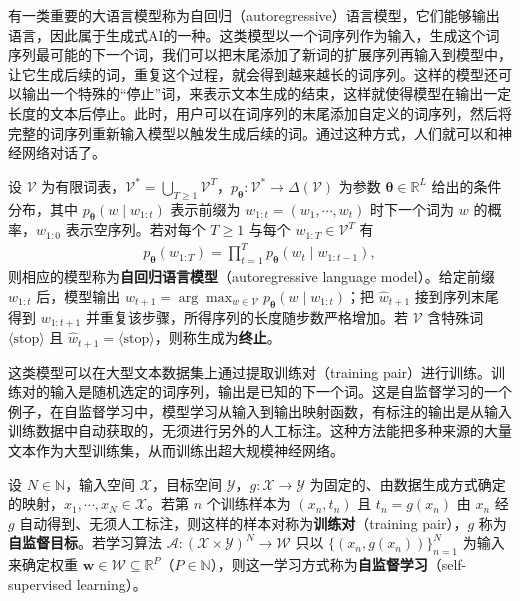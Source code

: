 \documentclass[../../main.tex]{subfiles}
\begin{document}
有一类重要的大语言模型称为自回归（autoregressive）语言模型，它们能够输出语言，因此属于生成式AI的一种。这类模型以一个词序列作为输入，生成这个词序列最可能的下一个词，我们可以把末尾添加了新词的扩展序列再输入到模型中，让它生成后续的词，重复这个过程，就会得到越来越长的词序列。这样的模型还可以输出一个特殊的“停止”词，来表示文本生成的结束，这样就使得模型在输出一定长度的文本后停止。此时，用户可以在词序列的末尾添加自定义的词序列，然后将完整的词序列重新输入模型以触发生成后续的词。通过这种方式，人们就可以和神经网络对话了。

\begin{definition}[自回归语言模型]\label{definition:ch01-自回归语言模型}
设 $\mathcal{V}$ 为有限词表，$\mathcal{V}^{*}=\bigcup_{T\geqslant1}\mathcal{V}^{T}$，$p_{\boldsymbol{\theta}}:\mathcal{V}^{*}\to\Delta(\mathcal{V})$ 为参数 $\boldsymbol{\theta}\in\mathbb{R}^{L}$ 给出的条件分布，其中 $p_{\boldsymbol{\theta}}(w\mid w_{1:t})$ 表示前缀为 $w_{1:t}=(w_{1},\cdots,w_{t})$ 时下一个词为 $w$ 的概率，$w_{1:0}$ 表示空序列。若对每个 $T\geqslant1$ 与每个 $w_{1:T}\in\mathcal{V}^{T}$ 有
\begin{align*}
  p_{\boldsymbol{\theta}}(w_{1:T})=\prod_{t=1}^{T}p_{\boldsymbol{\theta}}(w_{t}\mid w_{1:t-1}),
\end{align*}
则相应的模型称为\textbf{自回归语言模型}（autoregressive language model）。给定前缀 $w_{1:t}$ 后，模型输出 $\hat{w}_{t+1}=\arg\max_{w\in\mathcal{V}}p_{\boldsymbol{\theta}}(w\mid w_{1:t})$；把 $\hat{w}_{t+1}$ 接到序列末尾得到 $w_{1:t+1}$ 并重复该步骤，所得序列的长度随步数严格增加。若 $\mathcal{V}$ 含特殊词 $\langle\mathrm{stop}\rangle$ 且 $\hat{w}_{t+1}=\langle\mathrm{stop}\rangle$，则称生成为\textbf{终止}。
\end{definition}

这类模型可以在大型文本数据集上通过提取训练对（training pair）进行训练。训练对的输入是随机选定的词序列，输出是已知的下一个词。这是自监督学习的一个例子，在自监督学习中，模型学习从输入到输出映射函数，有标注的输出是从输入训练数据中自动获取的，无须进行另外的人工标注。这种方法能把多种来源的大量文本作为大型训练集，从而训练出超大规模神经网络。

\begin{definition}[训练对与自监督学习]\label{definition:ch01-自监督学习}
设 $N\in\mathbb{N}$，输入空间 $\mathcal{X}$，目标空间 $\mathcal{Y}$，$g:\mathcal{X}\to\mathcal{Y}$ 为固定的、由数据生成方式确定的映射，$x_1,\cdots,x_N\in\mathcal{X}$。若第 $n$ 个训练样本为 $(x_n,t_n)$ 且 $t_n=g(x_n)$ 由 $x_n$ 经 $g$ 自动得到、无须人工标注，则这样的样本对称为\textbf{训练对}（training pair），$g$ 称为\textbf{自监督目标}。若学习算法 $\mathcal{A}:(\mathcal{X}\times\mathcal{Y})^{N}\to\mathcal{W}$ 只以 $\{(x_n,g(x_n))\}_{n=1}^{N}$ 为输入来确定权重 $\mathbf{w}\in\mathcal{W}\subseteq\mathbb{R}^{P}$（$P\in\mathbb{N}$），则这一学习方式称为\textbf{自监督学习}（self-supervised learning）。
\end{definition}
\end{document}
